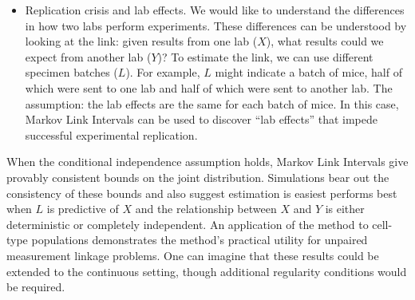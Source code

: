\documentclass{article}
\theoremstyle{definition}
\begin{document}
\begin{itemize}

    \item Replication crisis and lab effects.  We would like to understand the differences in how two labs perform experiments.  These differences can be understood by looking at the link: given results from one lab ($X$), what results could we expect from another lab ($Y$)?  To estimate the link, we can use different specimen batches ($L$).  For example, $L$ might indicate a batch of mice, half of which were sent to one lab and half of which were sent to another lab.  The assumption: the lab effects are the same for each batch of mice.  
    In this case, Markov Link Intervals can be used to discover ``lab effects'' that impede successful experimental replication.
\end{itemize}

When the conditional independence assumption holds, Markov Link Intervals  give provably consistent bounds on the joint distribution.  Simulations bear out the consistency of these bounds and also suggest estimation is easiest performs best when $L$ is predictive of $X$ and the relationship between $X$ and $Y$ is either deterministic or completely independent.  An application of the method to cell-type populations demonstrates the method's practical utility for unpaired measurement linkage problems.  One can imagine that these results could be extended to the continuous setting, though additional regularity conditions would be required.  




                                                 
\end{document}
